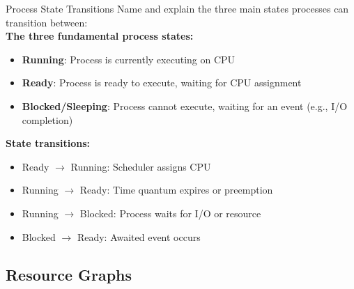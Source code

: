 \begin{example2}{Process State Transitions}
    Name and explain the three main states processes can transition between:
    \vspace{1mm}\\
    \textbf{The three fundamental process states:}
    \begin{itemize}
        \item \textbf{Running}: Process is currently executing on CPU
        \item \textbf{Ready}: Process is ready to execute, waiting for CPU assignment
        \item \textbf{Blocked/Sleeping}: Process cannot execute, waiting for an event (e.g., I/O completion)
    \end{itemize}
    
    \textbf{State transitions:}
    \begin{itemize}
        \item Ready $\rightarrow$ Running: Scheduler assigns CPU
        \item Running $\rightarrow$ Ready: Time quantum expires or preemption
        \item Running $\rightarrow$ Blocked: Process waits for I/O or resource
        \item Blocked $\rightarrow$ Ready: Awaited event occurs
    \end{itemize}
\end{example2}

\subsection{Resource Graphs}


